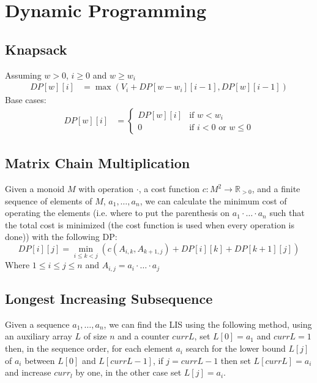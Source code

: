 \documentclass[../Notes/main.tex]{subfiles}
\begin{document}
\section{Dynamic Programming}

\subsection{Knapsack}
Assuming \(w>0\), \(i\geq0\) and \(w\geq w_i\)
\begin{align*}
    DP[w][i] & = \max(V_i+DP[w-w_i][i-1],DP[w][i-1])
\end{align*}
Base cases:
\begin{align*}
    DP[w][i] & =\begin{cases}
        DP[w][i] & \text{if }w<w_i                \\
        0        & \text{if }i<0\text{ or }w\leq0
    \end{cases}
\end{align*}

\subsection{Matrix Chain Multiplication}
Given a monoid \(M\) with operation \(\cdot\), a cost function \(c:M^2\rightarrow \mathbb{R}_{>0}\), and a finite sequence of elements of \(M\), \(a_1,\dots,a_n\), we can calculate the minimum cost of operating the elements (i.e. where to put the parenthesis on \(a_1\cdot\ldots\cdot a_n\) such that the total cost is minimized (the cost function is used when every operation is done)) with the following DP:
\begin{equation*}
    DP[i][j]=\min_{i\leq k<j}(c(A_{i,k},A_{k+1,j})+DP[i][k]+DP[k+1][j])
\end{equation*}
Where \(1\leq i\leq j\leq n\) and \(A_{i,j}=a_i\cdot\ldots\cdot a_j\)
%

\subsection{Longest Increasing Subsequence}
Given a sequence \(a_1,\ldots,a_n\), we can find the LIS using the following method, using an auxiliary array \(L\) of size \(n\) and a counter \(currL\), set \(L[0]=a_1\) and \(currL=1\) then, in the sequence order, for each element \(a_i\) search for the lower bound \(L[j]\) of \(a_i\) between \(L[0]\) and \(L[currL-1]\), if \(j=currL-1\) then set \(L[currL]=a_i\) and increase \(curr_l\) by one, in the other case set \(L[j]=a_i\).
%
\end{document}
